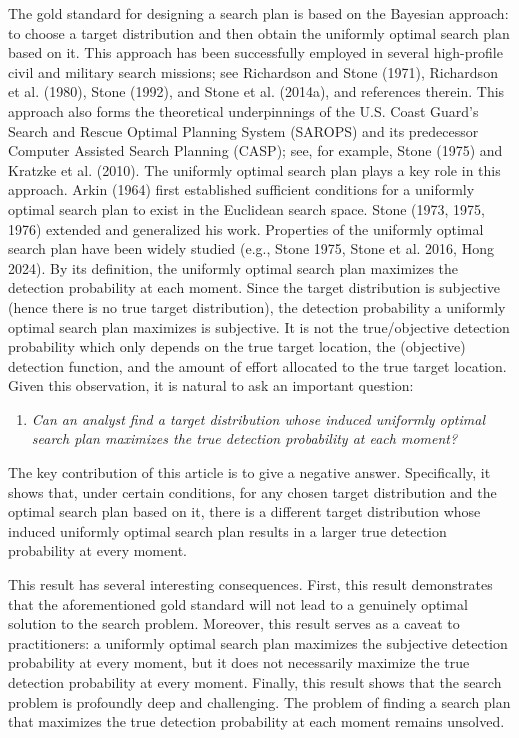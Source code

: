 \documentclass[12pt]{article}
\theoremstyle{plain}
\theoremstyle{definition}
\theoremstyle{remark}
\begin{document}
The gold standard for designing a search plan is based on the Bayesian approach: to choose a target distribution and then obtain the uniformly optimal search plan based on it.  This approach has been successfully employed in several high-profile civil and military search missions; see Richardson and Stone (1971), Richardson et al. (1980), Stone (1992), and Stone et al. (2014a), and references therein.  This approach also forms the theoretical underpinnings of the U.S. Coast Guard's Search and Rescue Optimal Planning System (SAROPS) and its predecessor Computer Assisted Search Planning (CASP); see, for example,  Stone (1975) and Kratzke et al. (2010).  The uniformly optimal search plan plays a key role in this approach. Arkin (1964) first established sufficient conditions for a uniformly optimal search plan to exist in the Euclidean search space.   Stone (1973, 1975, 1976) extended and generalized his work.  Properties of the uniformly optimal search plan have been widely studied (e.g., Stone 1975, Stone et al. 2016, Hong 2024).  By its definition, the uniformly optimal search plan maximizes the detection probability at each moment.  Since the target distribution is subjective (hence there is no true target distribution), the detection probability a uniformly optimal search plan maximizes is subjective. It is not the true/objective detection probability which only depends on the true target location,  the (objective) detection function, and the amount of effort allocated to the true target location.  Given this observation, it is natural to ask an important question:
\begin{enumerate}
\item[]\emph{Can an analyst find a target distribution whose induced uniformly optimal search plan maximizes the true detection probability at each moment?}
\end{enumerate}

\noindent The key contribution of this article is to give a negative answer. Specifically,   it shows that, under certain conditions,  for any chosen target distribution and the optimal search plan based on it,  there is a different target distribution whose induced uniformly optimal search plan results in a larger true detection probability at every moment. 


This result has several interesting consequences. First,  this result demonstrates that the aforementioned gold standard will not lead to a genuinely optimal solution to the search problem.  Moreover,  this result serves as a caveat to practitioners: a uniformly optimal search plan maximizes the subjective detection probability at every moment, but it does not necessarily maximize the true detection probability at every moment.  Finally,  this result shows that the search problem is profoundly deep and challenging.  The problem of finding a search plan that maximizes the true detection probability at each moment remains unsolved.  
\end{document}
